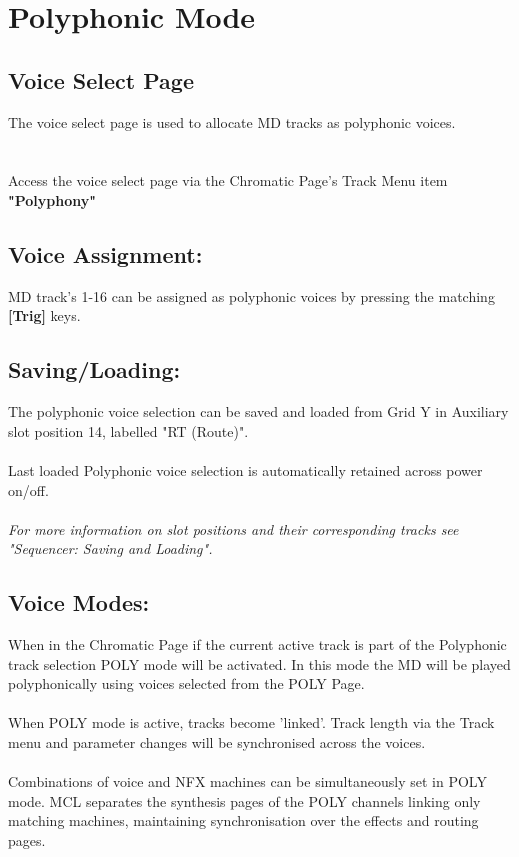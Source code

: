 \chapter{Polyphonic Mode}

\section{Voice Select Page}
The voice select page is used to allocate MD tracks as polyphonic voices.\\
\\\\
Access the voice select page via the Chromatic Page's Track Menu item \textbf{"Polyphony"}
\section{Voice Assignment:}
MD track's 1-16 can be assigned as polyphonic voices by pressing the matching \textbf{[Trig]} keys.
\section{Saving/Loading:}
The polyphonic voice selection can be saved and loaded from Grid Y in Auxiliary slot position 14, labelled "RT (Route)". 
\\\\Last loaded Polyphonic voice selection is automatically retained across power on/off.
\\\\
\textit{For more information on slot positions and their corresponding tracks see  "Sequencer: Saving and Loading".}
\section{Voice Modes:}

When in the Chromatic Page if the current active track is part of the Polyphonic track selection POLY mode will be activated. In this mode the MD will be played polyphonically using voices selected from the POLY Page.\\
\\
When POLY mode is active, tracks become 'linked'. Track length via the Track menu and parameter changes will be synchronised across the voices. 
\\\\
Combinations of voice and NFX machines can be simultaneously set in POLY mode.  MCL separates the synthesis pages of the POLY channels linking only matching machines, maintaining synchronisation over the effects and routing pages. 
\newpage
